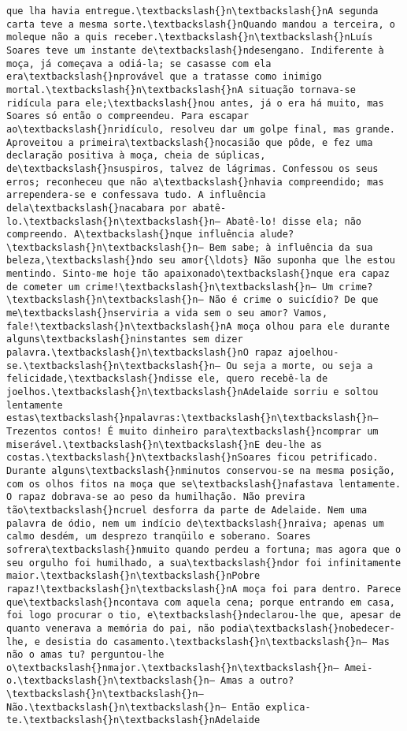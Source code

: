 \begin{Verbatim}[commandchars=\\\{\}]
que lha havia entregue.\textbackslash{}n\textbackslash{}nA segunda carta teve a mesma sorte.\textbackslash{}nQuando mandou a terceira, o moleque não a quis receber.\textbackslash{}n\textbackslash{}nLuís Soares teve um instante de\textbackslash{}ndesengano. Indiferente à moça, já começava a odiá-la; se casasse com ela era\textbackslash{}nprovável que a tratasse como inimigo mortal.\textbackslash{}n\textbackslash{}nA situação tornava-se ridícula para ele;\textbackslash{}nou antes, já o era há muito, mas Soares só então o compreendeu. Para escapar ao\textbackslash{}nridículo, resolveu dar um golpe final, mas grande. Aproveitou a primeira\textbackslash{}nocasião que pôde, e fez uma declaração positiva à moça, cheia de súplicas, de\textbackslash{}nsuspiros, talvez de lágrimas. Confessou os seus erros; reconheceu que não a\textbackslash{}nhavia compreendido; mas arrependera-se e confessava tudo. A influência dela\textbackslash{}nacabara por abatê-lo.\textbackslash{}n\textbackslash{}n— Abatê-lo! disse ela; não compreendo. A\textbackslash{}nque influência alude?\textbackslash{}n\textbackslash{}n— Bem sabe; à influência da sua beleza,\textbackslash{}ndo seu amor{\ldots} Não suponha que lhe estou mentindo. Sinto-me hoje tão apaixonado\textbackslash{}nque era capaz de cometer um crime!\textbackslash{}n\textbackslash{}n— Um crime?\textbackslash{}n\textbackslash{}n— Não é crime o suicídio? De que me\textbackslash{}nserviria a vida sem o seu amor? Vamos, fale!\textbackslash{}n\textbackslash{}nA moça olhou para ele durante alguns\textbackslash{}ninstantes sem dizer palavra.\textbackslash{}n\textbackslash{}nO rapaz ajoelhou-se.\textbackslash{}n\textbackslash{}n— Ou seja a morte, ou seja a felicidade,\textbackslash{}ndisse ele, quero recebê-la de joelhos.\textbackslash{}n\textbackslash{}nAdelaide sorriu e soltou lentamente estas\textbackslash{}npalavras:\textbackslash{}n\textbackslash{}n— Trezentos contos! É muito dinheiro para\textbackslash{}ncomprar um miserável.\textbackslash{}n\textbackslash{}nE deu-lhe as costas.\textbackslash{}n\textbackslash{}nSoares ficou petrificado. Durante alguns\textbackslash{}nminutos conservou-se na mesma posição, com os olhos fitos na moça que se\textbackslash{}nafastava lentamente. O rapaz dobrava-se ao peso da humilhação. Não previra tão\textbackslash{}ncruel desforra da parte de Adelaide. Nem uma palavra de ódio, nem um indício de\textbackslash{}nraiva; apenas um calmo desdém, um desprezo tranqüilo e soberano. Soares sofrera\textbackslash{}nmuito quando perdeu a fortuna; mas agora que o seu orgulho foi humilhado, a sua\textbackslash{}ndor foi infinitamente maior.\textbackslash{}n\textbackslash{}nPobre rapaz!\textbackslash{}n\textbackslash{}nA moça foi para dentro. Parece que\textbackslash{}ncontava com aquela cena; porque entrando em casa, foi logo procurar o tio, e\textbackslash{}ndeclarou-lhe que, apesar de quanto venerava a memória do pai, não podia\textbackslash{}nobedecer-lhe, e desistia do casamento.\textbackslash{}n\textbackslash{}n— Mas não o amas tu? perguntou-lhe o\textbackslash{}nmajor.\textbackslash{}n\textbackslash{}n— Amei-o.\textbackslash{}n\textbackslash{}n— Amas a outro?\textbackslash{}n\textbackslash{}n— Não.\textbackslash{}n\textbackslash{}n— Então explica-te.\textbackslash{}n\textbackslash{}nAdelaide 
\end{Verbatim}
